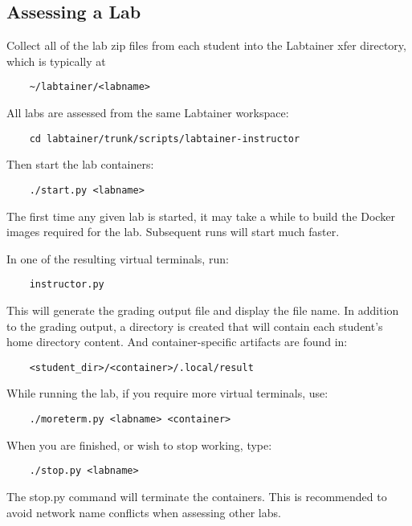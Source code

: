 \documentclass{article}
\begin{document}
\subsection{Assessing a Lab}
Collect all of the lab zip files from each student into the Labtainer xfer directory, which
is typically at
\begin{verbatim}
    ~/labtainer/<labname>
\end{verbatim}
All labs are assessed from the same Labtainer workspace:
\begin{verbatim}
    cd labtainer/trunk/scripts/labtainer-instructor
\end{verbatim}
\noindent Then start the lab containers:
\begin{verbatim}
    ./start.py <labname>
\end{verbatim}

The first time any given lab is started, it may take a while to build the Docker images 
required for the lab.  Subsequent runs will start much faster.

In one of the resulting virtual terminals, run:
\begin{verbatim}
    instructor.py
\end{verbatim}
\noindent This will generate the grading output file and display the file name.  In
addition to the grading output, a directory is created that will contain each student's
home directory content.  And container-specific artifacts are found in:
\begin{verbatim}
    <student_dir>/<container>/.local/result
\end{verbatim}

While running the lab, if you require more virtual terminals, use:
\begin{verbatim}
    ./moreterm.py <labname> <container>
\end{verbatim}

When you are finished, or wish to stop working, type:
\begin{verbatim}
    ./stop.py <labname>
\end{verbatim}
The stop.py command will terminate the containers.  This is recommended to avoid network
name conflicts when assessing other labs.

\newpage
\appendix 
\end{document}
